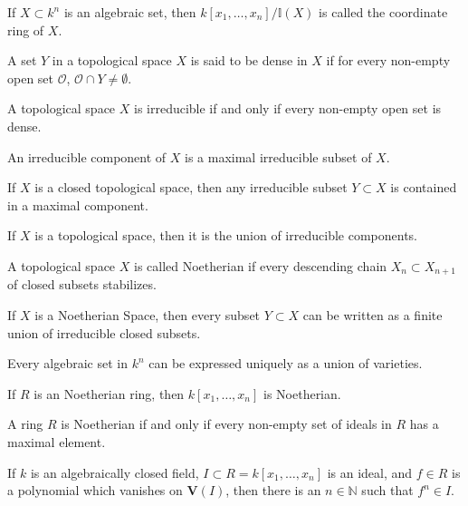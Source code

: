 \documentclass[crop=false,class=article,oneside]{standalone}
\begin{document}
    \begin{definition}
    If $X\subset k^n$ is an algebraic set, then $k[x_1,\hdots ,x_n]/\mathbb{I}(X)$ is called the coordinate ring of $X$.
    \end{definition}
    \begin{definition}
    A set $Y$ in a topological space $X$ is said to be dense in $X$ if for every non-empty open set $\mathcal{O}$, $\mathcal{O}\cap Y\ne \emptyset$.
    \end{definition}
    \begin{theorem}
    A topological space $X$ is irreducible if and only if every non-empty open set is dense.
    \end{theorem}
    \begin{definition}
    An irreducible component of $X$ is a maximal irreducible subset of $X$.
    \end{definition}
    \begin{theorem}
    If $X$ is a closed topological space, then any irreducible subset $Y\subset X$ is contained in a maximal component.
    \end{theorem}
    \begin{theorem}
    If $X$ is a topological space, then it is the union of irreducible components.
    \end{theorem}
    \begin{definition}
    A topological space $X$ is called Noetherian if every descending chain $X_n \subset X_{n+1}$ of closed subsets stabilizes.
    \end{definition}
    \begin{theorem}
    If $X$ is a Noetherian Space, then every subset $Y\subset X$ can be written as a finite union of irreducible closed subsets.
    \end{theorem}
    \begin{theorem}
    Every algebraic set in $k^n$ can be expressed uniquely as a union of varieties.
    \end{theorem}
    \begin{theorem}
    If $R$ is an Noetherian ring, then $k[x_1,\hdots ,x_n]$ is Noetherian.
    \end{theorem}
    \begin{theorem}
    A ring $R$ is Noetherian if and only if every non-empty set of ideals in $R$ has a maximal element.
    \end{theorem}
    \begin{theorem}
    If $k$ is an algebraically closed field, $I\subset R = k[x_1,\hdots ,x_n]$ is an ideal, and $f\in R$ is a polynomial which vanishes on $\mathbf{V}(I)$, then there is an $n\in \mathbb{N}$ such that $f^n \in I$.
    \end{theorem}
\end{document}
